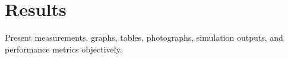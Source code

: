 \section{Results}
Present measurements, graphs, tables, photographs, simulation 
outputs, and performance metrics objectively.